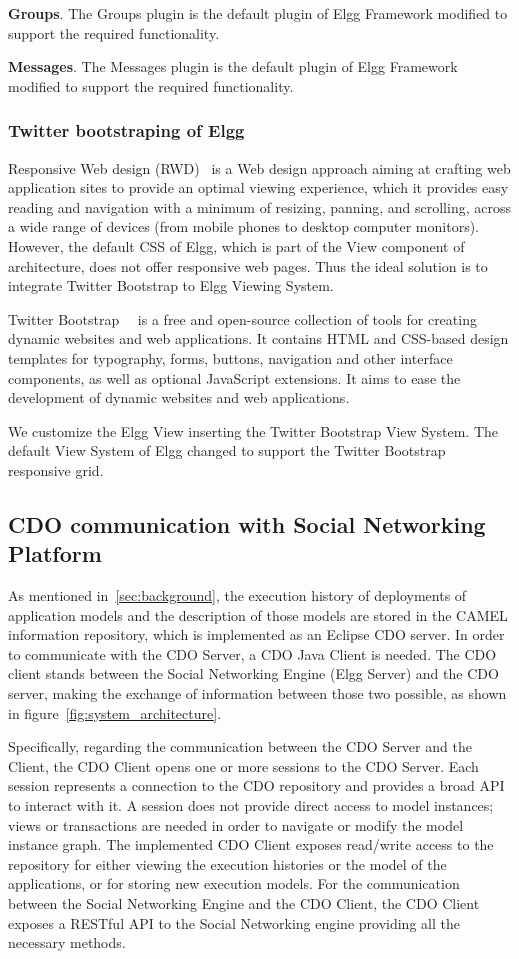 \textbf{Groups}. The Groups plugin is the default plugin of Elgg Framework modified to support the required functionality.

\textbf{Messages}. The Messages plugin is the default plugin of Elgg Framework modified to support the required functionality.

\subsubsection{Twitter bootstraping of Elgg}
Responsive Web design (RWD)~\cite{natda2013responsive} is a Web design approach aiming at crafting web application sites to provide an optimal viewing experience, which it provides easy reading and navigation with a minimum of resizing, panning, and scrolling, across a wide range of devices (from mobile phones to desktop computer monitors). However, the default CSS of Elgg, which is part of the View component of architecture, does not offer responsive web pages. Thus the ideal solution is to integrate Twitter Bootstrap to Elgg Viewing System. 

Twitter Bootstrap~\cite{twitter_bootstrap}~\cite{cochran2012twitter} is a free and open-source collection of tools for creating dynamic websites and web applications. It contains HTML and CSS-based design templates for typography, forms, buttons, navigation and other interface components, as well as optional JavaScript extensions. It aims to ease the development of dynamic websites and web applications. 

We customize the Elgg View inserting the Twitter Bootstrap View System. The default View System of Elgg changed to support the Twitter Bootstrap responsive grid.

\subsection{CDO communication with Social Networking Platform}
\label{sec:cdo_comm}
As mentioned in~\ref{sec:background}, the execution history of deployments of application models and the description of those models are stored in the CAMEL information repository, which is implemented as an Eclipse CDO server. In order to communicate with the CDO Server, a CDO Java Client is needed. The CDO client stands between the Social Networking Engine (Elgg Server) and the CDO server, making the exchange of information between those two possible, as shown in figure~\ref{fig:system_architecture}.

Specifically, regarding the communication between the CDO Server and the Client, the CDO Client opens one or more sessions to the CDO Server. Each session represents a connection to the CDO repository and provides a broad API to interact with it. A session does not provide direct access to model instances; views or transactions are needed in order to navigate or modify the model instance graph. The implemented CDO Client exposes read/write access to the repository for either viewing the execution histories or the model of the applications, or for storing new execution models. For the communication between the Social Networking Engine and the CDO Client, the CDO Client exposes a RESTful API to the Social Networking engine providing all the necessary methods. 

